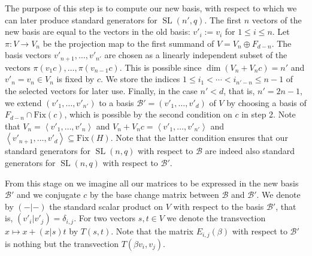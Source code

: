 \documentclass[a4paper,11pt]{article}
\def\SL{\operatorname{SL}}
\newcommand{\Fix}[1]{\mathrm{Fix}(#1)}
\newcommand{\B}{\mathcal{B}}
\begin{document}
\begin{enumerate}
The purpose of this step is to compute our new basis, with respect to
which we can later produce standard generators for $\SL(n',q)$.
The first $n$ vectors of the new basis are equal to the vectors in
the old basis: $v'_i := v_i$ for $1 \le i \le n$.
Let $\pi: V \to V_n$ be the projection map to the first summand of
$V = V_n \oplus F_{d-n}$. The basis vectors
$v'_{n+1}, \ldots, v'_{n'}$ are chosen as a linearly independent subset
of the vectors $\pi(v_1c), \ldots, \pi(v_{n-1}c)$. This is possible
since $\dim(V_n + V_n c) = n'$ and $v'_n=v_n \in V_n$ is fixed by $c$.
We store the indices $1 \le i_1 < \cdots < i_{n'-n} \le n-1$ of the
selected vectors for later use. Finally, in the case $n' < d$, that is,
$n'=2n-1$, we extend $(v'_1, \ldots, v'_{n'})$ to a basis $\B' = (v'_1,
\ldots, v'_d)$ of $V$ by choosing a basis of $F_{d-n} \cap \Fix c$, which
is possible by the second condition on $c$ in step 2. Note that $V_n =
\left< v'_1, \ldots, v'_n\right>$ and $V_n + V_nc = \left< v'_1, \ldots,
v'_{n'}\right>$ and $\left< v'_{n+1}, \ldots, v'_d\right> \subseteq \Fix
H$. Note that the latter condition ensures that our standard generators
for $\SL(n,q)$ with respect to $\B$ are indeed also standard generators
for $\SL(n,q)$ with respect to $\B'$.
\end{enumerate}

\noindent
From this stage on we imagine all our matrices to be expressed in the
new basis $\B'$ and we conjugate $c$ by the base change matrix between
$\B$ and $\B'$. We denote by $(-|-)$ the standard scalar product on $V$
with respect to the basis $\B'$, that is, $(v'_i|v'_j) = \delta_{i,j}$.
For two vectors $s,t \in V$ we denote the transvection $x \mapsto x +
(x|s)t$ by $T(s,t)$. Note that the matrix $E_{i,j}(\beta)$ with respect
to $\B'$ is nothing but the transvection $T(\beta v_i,v_j)$.
\end{document}
